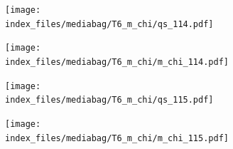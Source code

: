 \documentclass[
  11pt,
  letterpaper,
]{scrreprt}
\begin{document}
\begin{figure}

\begin{minipage}{0.50\linewidth}

\begin{figure}[H]

{\centering \texttt{[image: index\_files/mediabag/T6\_m\_chi/qs\_114.pdf]}

}


\end{figure}%

\end{minipage}%
%
\begin{minipage}{0.50\linewidth}

\begin{figure}[H]

{\centering \texttt{[image: index\_files/mediabag/T6\_m\_chi/m\_chi\_114.pdf]}

}


\end{figure}%

\end{minipage}%

\end{figure}%

\begin{figure}

\begin{minipage}{0.50\linewidth}

\begin{figure}[H]

{\centering \texttt{[image: index\_files/mediabag/T6\_m\_chi/qs\_115.pdf]}

}


\end{figure}%

\end{minipage}%
%
\begin{minipage}{0.50\linewidth}

\begin{figure}[H]

{\centering \texttt{[image: index\_files/mediabag/T6\_m\_chi/m\_chi\_115.pdf]}

}


\end{figure}%

\end{minipage}%

\end{figure}%
\end{document}
